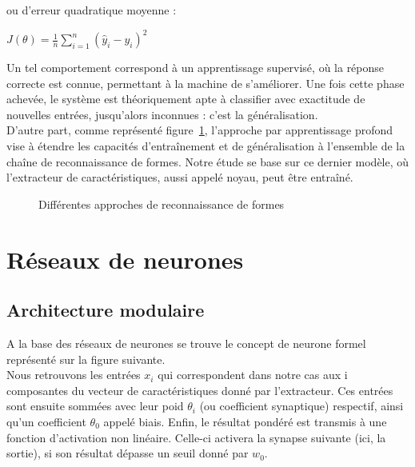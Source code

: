\documentclass[a4paper,10pt]{report}
\begin{document}
ou d'erreur quadratique moyenne\cite{Bib_WikiMSE} : 

\begin{center} $ J({\theta}) =  \frac{1}{n}\sum\limits_{i=1}^{n} (\hat{y}_{i} - y_{i})^2 $ \end{center} 

Un tel comportement correspond à un apprentissage supervisé, où la réponse correcte est connue, permettant à la machine de s'améliorer. Une fois cette phase achevée, le système est théoriquement apte à
classifier avec exactitude de nouvelles entrées, jusqu'alors inconnues : c'est la généralisation. 
\\

D'autre part, comme représenté figure~\ref{fig:c1p1s2}, l'approche par apprentissage profond vise à étendre les capacités d'entraînement et de généralisation à l'ensemble de la chaîne de reconnaissance de formes.
Notre étude se base sur ce dernier modèle, où l'extracteur de caractéristiques, aussi appelé noyau, peut être entraîné.
\begin{figure}[H]
    \centering
    \makebox[\textwidth]{}
    \caption{Différentes approches de reconnaissance de formes}
    \label{fig:c1p1s2}
\end{figure}




\section{Réseaux de neurones}

\subsection{Architecture modulaire}

A la base des réseaux de neurones se trouve le concept de neurone formel représenté sur la figure suivante.
\\

Nous retrouvons les entrées $x_{i}$ qui correspondent dans notre cas aux i composantes du vecteur de caractéristiques donné par l'extracteur. 
Ces entrées sont ensuite sommées avec leur poid $\theta_{i}$ (ou coefficient synaptique) respectif, ainsi qu'un coefficient $\theta_{0}$ appelé biais. 
Enfin, le résultat pondéré est transmis à une fonction d'activation non linéaire\cite{Bib_WikiAN}. Celle-ci activera la synapse suivante (ici, la sortie), si son résultat dépasse un seuil donné par $w_{0}$.
\\
\end{document}
